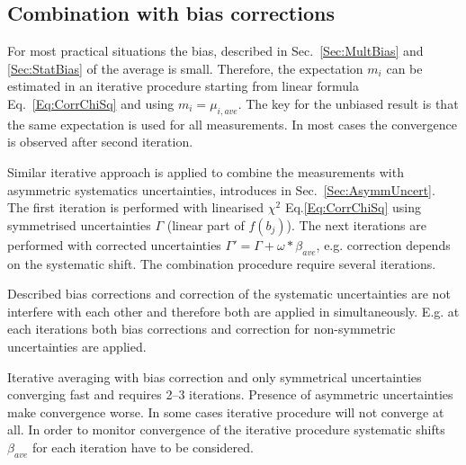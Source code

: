 \subsection{Combination with bias corrections}
\label{Sec:MinimizeBias}

For most practical situations the bias, described in Sec.~\ref{Sec:MultBias} and \ref{Sec:StatBias} of the average is small. Therefore, the expectation $m_i$ can be estimated in an iterative procedure starting from linear formula Eq.~\ref{Eq:CorrChiSq} and using $m_i = \mu_{i,ave}$. The key for the unbiased result is that the same expectation is used for all measurements. In most cases the convergence is observed after second iteration.

Similar iterative approach is applied to combine the measurements with asymmetric systematics uncertainties, introduces in Sec.~\ref{Sec:AsymmUncert}. The first iteration is performed with linearised $\chi^2$ Eq.\ref{Eq:CorrChiSq} using symmetrised uncertainties $\Gamma$ (linear part of $f(b_j)$). The next iterations are performed with corrected uncertainties $\Gamma' = \Gamma + \omega*\beta_{ave}$, e.g. correction depends on the systematic shift. The combination procedure require several iterations.

Described bias corrections and correction of the systematic uncertainties are not interfere with each other and therefore both are applied in simultaneously. E.g. at each iterations both bias corrections and correction for non-symmetric uncertainties are applied. 

Iterative averaging with bias correction and only symmetrical uncertainties converging fast and requires 2--3 iterations. Presence of asymmetric uncertainties make convergence worse. In some cases iterative procedure will not converge at all. In order to monitor convergence of the iterative procedure systematic shifts $\beta_{ave}$ for each iteration have to be considered.